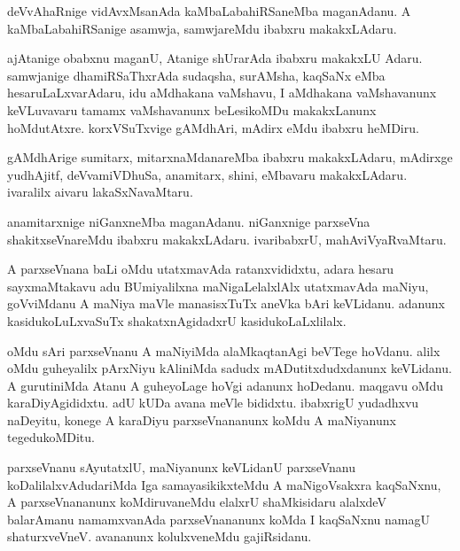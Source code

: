 \documentclass{article}
\begin{document}
\begin{mn}
deVvAhaRnige vidAvxMsanAda kaMbaLabahiRSaneMba maganAdanu. A
kaMbaLabahiRSanige asamwja, samwjareMdu ibabxru makakxLAdaru.
\end{mn}

\begin{mn}%
ajAtanige obabxnu maganU, Atanige shUrarAda ibabxru makakxLU
Adaru. samwjanige dhamiRSaThxrAda sudaqsha, surAMsha, kaqSaNx eMba
hesaruLaLxvarAdaru, idu aMdhakana vaMshavu, I aMdhakana vaMshavanunx
keVLuvavaru tamamx vaMshavanunx beLesikoMDu makakxLanunx
hoMdutAtxre. korxVSuTxvige gAMdhAri, mAdirx eMdu ibabxru heMDiru.
\end{mn}

\begin{mn}
gAMdhArige sumitarx, mitarxnaMdanareMba ibabxru makakxLAdaru, mAdirxge
yudhAjitf, deVvamiVDhuSa, anamitarx, shini, eMbavaru
makakxLAdaru. ivaralilx aivaru lakaSxNavaMtaru.
\end{mn}

\begin{mn}
anamitarxnige niGanxneMba maganAdanu. niGanxnige parxseVna
shakitxseVnareMdu ibabxru makakxLAdaru. ivaribabxrU, mahAviVyaRvaMtaru.
\end{mn}

\begin{mn}%
A parxseVnana baLi oMdu utatxmavAda ratanxvididxtu, adara hesaru
sayxmaMtakavu adu BUmiyalilxna maNigaLelalxlAlx utatxmavAda maNiyu,
goVviMdanu A maNiya maVle manasisxTuTx aneVka bAri keVLidanu. adanunx
kasidukoLuLxvaSuTx shakatxnAgidadxrU kasidukoLaLxlilalx.
\end{mn}

\begin{mn}%
oMdu sAri parxseVnanu A maNiyiMda alaMkaqtanAgi beVTege hoVdanu. alilx
oMdu guheyalilx pArxNiyu kAliniMda sadudx mADutitxdudxdanunx
keVLidanu. A gurutiniMda Atanu A guheyoLage hoVgi adanunx
hoDedanu. maqgavu oMdu karaDiyAgididxtu. adU kUDa avana meVle
bididxtu. ibabxrigU yudadhxvu naDeyitu, konege A karaDiyu
parxseVnananunx koMdu A maNiyanunx tegedukoMDitu.
\end{mn}

\begin{mn}%
parxseVnanu sAyutatxlU, maNiyanunx keVLidanU parxseVnanu
koDalilalxvAdudariMda Iga samayasikikxteMdu A maNigoVsakxra kaqSaNxnu,
A parxseVnananunx koMdiruvaneMdu elalxrU shaMkisidaru alalxdeV
balarAmanu namamxvanAda parxseVnananunx koMda I kaqSaNxnu namagU
shaturxveVneV. avananunx kolulxveneMdu gajiRsidanu.
\end{mn}
\end{document}
